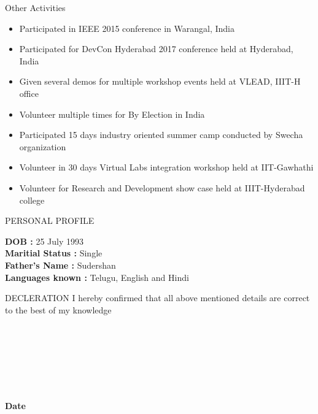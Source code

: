 \documentclass{resume} %
\newcommand{\tab}[1]{\hspace{.2667\textwidth}\rlap{#1}}
\begin{document}
\break
\begin{rSection}{Other Activities}
\begin{itemize}
\item Participated in IEEE 2015 conference in Warangal, India
\item Participated for DevCon Hyderabad 2017 conference held
  at Hyderabad, India
\item Given several demos for multiple workshop events held
  at VLEAD, IIIT-H office
\item Volunteer multiple times for By Election in India
\item Participated 15 days industry oriented summer camp
  conducted by Swecha organization
\item Volunteer in 30 days Virtual Labs integration workshop
  held at IIT-Gawhathi
\item Volunteer for Research and Development show case held
  at IIIT-Hyderabad college
 
\end{itemize}
\end{rSection}


\begin{rSection}{PERSONAL PROFILE}

  \textbf {DOB :} 25 July 1993\\
  \textbf {Maritial Status :} Single \\
  \textbf {Father's Name : } Sudershan \\
  \textbf {Languages known :} Telugu, English and Hindi \\

\end{rSection}

\begin{rSection}{DECLERATION}
  {I hereby confirmed that all above mentioned details are
    correct to the best of my knowledge }
  \\ \\ \\ \\ \\ \\ \\ \\
  \textbf {Date} \tab {\tab {\tab {\textbf{Signature}}}}
\end{rSection}
\end{document}
